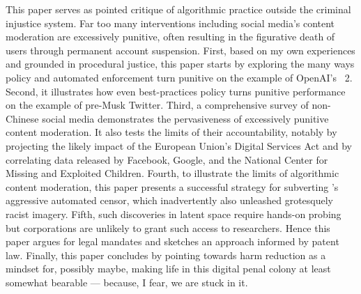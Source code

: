 This paper serves as pointed critique of algorithmic practice outside the
criminal injustice system. Far too many interventions including social media's
content moderation are excessively punitive, often resulting in the figurative
death of users through permanent account suspension. First, based on my own
experiences and grounded in procedural justice, this paper starts by exploring
the many ways policy and automated enforcement turn punitive on the example of
OpenAI's \DALLE\ 2. Second, it illustrates how even best-practices policy turns
punitive performance on the example of pre-Musk Twitter. Third, a comprehensive
survey of non-Chinese social media demonstrates the pervasiveness of excessively
punitive content moderation. It also tests the limits of their accountability,
notably by projecting the likely impact of the European Union's Digital Services
Act and by correlating data released by Facebook, Google, and the National
Center for Missing and Exploited Children. Fourth, to illustrate the limits of
algorithmic content moderation, this paper presents a successful strategy for
subverting \DALLE's aggressive automated censor, which inadvertently also
unleashed grotesquely racist imagery. Fifth, such discoveries in latent space
require hands-on probing but corporations are unlikely to grant such access to
researchers. Hence this paper argues for legal mandates and sketches an approach
informed by patent law. Finally, this paper concludes by pointing towards harm
reduction as a mindset for, possibly maybe, making life in this digital penal
colony at least somewhat bearable --- because, I fear, we are stuck in it.
